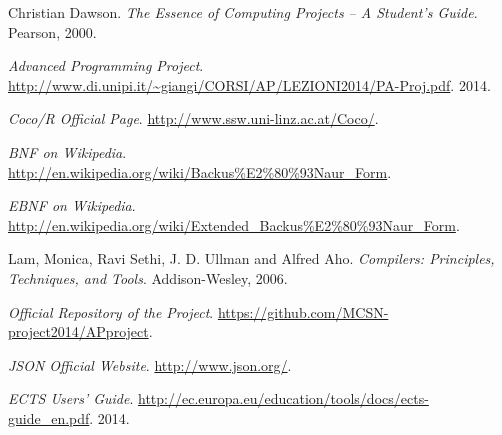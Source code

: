 \cleardoublepage  					%


\begin{thebibliography}{99}
 Christian Dawson. \emph{The Essence of Computing Projects -- A Student's Guide}. Pearson, 2000.

\emph{Advanced Programming Project}. \href{http:\/\/www.di.unipi.it\/\~giangi\/CORSI\/AP\/LEZIONI2014\/PA-Proj.pdf}{\url{http://www.di.unipi.it/~giangi/CORSI/AP/LEZIONI2014/PA-Proj.pdf}}. 2014.

\emph{Coco/R Official Page}. \href{http:\/\/www.ssw.uni-linz.ac.at\/Coco\/}{\url{http://www.ssw.uni-linz.ac.at/Coco/}}.

\emph{BNF on Wikipedia}. \href{http:\/\/en.wikipedia.org\/wiki\/Backus\%E2\%80\%93Naur\_Form}{\url{http://en.wikipedia.org/wiki/Backus\%E2\%80\%93Naur\_Form}}.

\emph{EBNF on Wikipedia}. \href{http:\/ \/en.wikipedia.org\/wiki\/Extended\_Backus\%E2\%80\%93Naur\_Form}{\url{http://en.wikipedia.org/wiki/Extended\_Backus\%E2\%80\%93Naur\_Form}}.

Lam, Monica, Ravi Sethi, J. D. Ullman and Alfred Aho. \emph{Compilers: Principles, Techniques, and Tools}. Addison-Wesley, 2006.

\emph{Official Repository of the Project}. \href{https:\/\/github.com\/MCSN-project2014\/APproject}{\url{https://github.com/MCSN-project2014/APproject}}.

\emph{JSON Official Website}. \href{http:\/\/www.json.org\/}{\url{http://www.json.org/}}.


\emph{ECTS Users' Guide}. \href{http:\/\/ec.europa.eu\/education\/tools\/docs\/ects-guide_en.pdf}{\url{http://ec.europa.eu/education/tools/docs/ects-guide_en.pdf}}. 2014.




\end{thebibliography}
